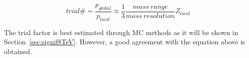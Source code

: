 \begin{equation}\label{eqn:trials}
trial\# = \frac{p_{global}}{p_{local}} \approx \frac{1}{3}\frac{mass\ range}{mass\ resolution}Z_{local}
\end{equation}

The trial factor is best estimated through MC methods as it will be shown in Section~\ref{sec:signif8TeV}. However, a good agreement with the equation above is obtained.